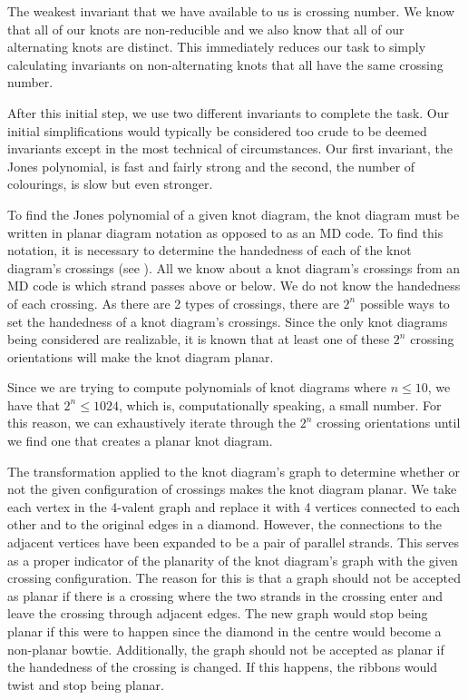 \begin{paper}
The weakest invariant that we have available to us is crossing number.
We know that all of our knots are non-reducible and we also know that all of our
alternating knots are distinct.
This immediately reduces our task to simply calculating invariants on
non-alternating knots that all have the same crossing number.

After this initial step, we use two different invariants to complete the task.
Our initial simplifications would typically be considered too crude to be deemed
invariants except in the most technical of circumstances.
Our first invariant, the Jones polynomial, is fast and fairly strong and the
second, the number of colourings, is slow but even stronger.



To find the Jones polynomial of a given knot diagram, the knot diagram must be
written in planar diagram notation as opposed to as an MD code.
To find this notation, it is necessary to determine the handedness of each of
the knot diagram's crossings (see \figCrossings).
All we know about a knot diagram's crossings from an MD code is which strand
passes above or below.
We do not know the handedness of each crossing.
As there are 2 types of crossings, there are $2^n$ possible ways to set the
handedness of a knot diagram's crossings.
Since the only knot diagrams being considered are realizable, it is known that
at least one of these $2^n$ crossing orientations will make the knot diagram
planar.

Since we are trying to compute polynomials of knot diagrams where $n\leq10$,
we have that $2^n\leq1024$, which is, computationally speaking, a small number.
For this reason, we can exhaustively iterate through the $2^n$ crossing
orientations until we find one that creates a planar knot diagram.

{The transformation applied to the knot diagram's graph to determine whether or
not the given configuration of crossings makes the knot diagram planar.
We take each vertex in the 4-valent graph and replace it with 4 vertices
connected to each other and to the original edges in a diamond.
However, the connections to the adjacent vertices have been expanded to be a
pair of parallel strands.
This serves as a proper indicator of the planarity of the knot diagram's graph
with the given crossing configuration.
The reason for this is that a graph should not be accepted as planar if there is
a crossing where the two strands in the crossing enter and leave the crossing
through adjacent edges.
The new graph would stop being planar if this were to happen since the diamond
in the centre would become a non-planar bowtie.
Additionally, the graph should not be accepted as planar if the handedness of
the crossing is changed.
If this happens, the ribbons would twist and stop being planar.}


\end{paper}
